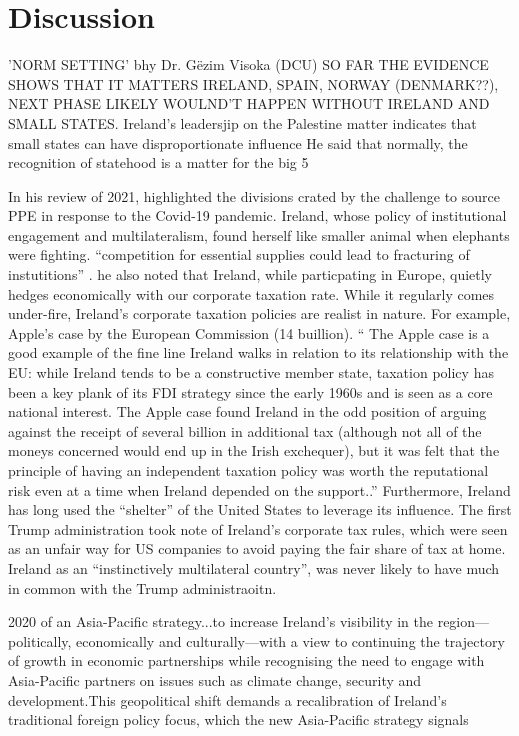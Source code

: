\chapter{Discussion}


'NORM SETTING' bhy Dr. Gëzim Visoka (DCU)
SO FAR THE EVIDENCE SHOWS THAT IT MATTERS
IRELAND, SPAIN, NORWAY (DENMARK??), NEXT PHASE LIKELY WOULND’T HAPPEN WITHOUT IRELAND AND SMALL STATES. Ireland’s leadersjip on the Palestine matter indicates that small states can have disproportionate influence
He said that normally, the recognition of statehood is a matter for the big 5


In his review of 2021, \parencite{MCDONAGH_2021} highlighted the divisions crated by the challenge to source PPE in response to the Covid-19 pandemic. Ireland, whose policy of institutional engagement and multilateralism, found herself like smaller animal when elephants were fighting. ``competition for essential supplies could lead to fracturing of instutitions'' . he also noted that Ireland, while particpating in Europe, quietly hedges economically with our corporate taxation rate. While it regularly comes under-fire, Ireland's corporate taxation policies are realist in nature. For example, Apple's case by the European Commission (14 buillion). `` The Apple case is a good example of the fine line Ireland walks in relation to 
its relationship with the EU: while Ireland tends to be a constructive member 
state, taxation policy has been a key plank of its FDI strategy since the early 
1960s and is seen as a core national interest. The Apple case found Ireland in the 
odd position of arguing against the receipt of several billion in additional tax 
(although not all of the moneys concerned would end up in the Irish exchequer), 
but it was felt that the principle of having an independent taxation policy was 
worth the reputational risk even at a time when Ireland depended on the support..'' Furthermore, Ireland has long used the ``shelter'' of the United States to leverage its influence. The first Trump administration took note of Ireland's corporate tax rules, which were seen as an unfair way for US companies to avoid paying the fair share of tax at home. Ireland as an ``instinctively multilateral country'', was never likely to have much in common with the Trump administraoitn.

2020 of an Asia-Pacific strategy...to increase Ireland’s visibility in the 
region—politically, economically and culturally—with a view to continuing the 
trajectory of growth in economic partnerships while recognising the need to 
engage with Asia-Pacific partners on issues such as climate change, security and 
development.This geopolitical shift demands a recalibration of Ireland’s 
traditional foreign policy focus, which the new Asia-Pacific strategy signals